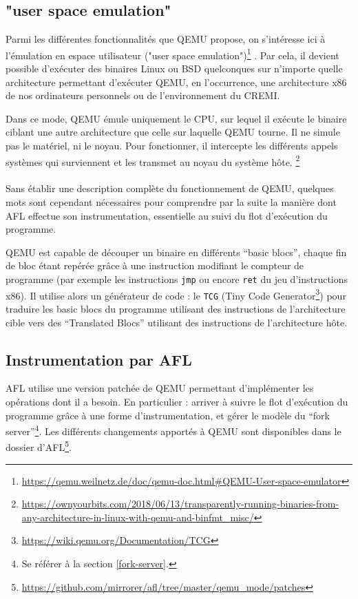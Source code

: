 \subsection{"user space emulation"}

Parmi les différentes fonctionnalités que QEMU propose, on s'intéresse ici à l'émulation en espace utilisateur ("user space emulation")\footnote{\url{https://qemu.weilnetz.de/doc/qemu-doc.html\#QEMU-User-space-emulator}} \cite{qemu}.
Par cela, il devient possible d'exécuter des binaires Linux ou BSD quelconques sur n'importe quelle architecture permettant d'exécuter QEMU, en l'occurrence, une architecture x86 de nos ordinateurs personnels ou de l'environnement du CREMI.

Dans ce mode, QEMU émule uniquement le CPU, sur lequel il exécute le binaire ciblant une autre architecture que celle sur laquelle QEMU tourne.
Il ne simule pas le matériel, ni le noyau.
Pour fonctionner, il intercepte les différents appels systèmes qui surviennent et les transmet au noyau du système hôte.
\footnote{\url{https://ownyourbits.com/2018/06/13/transparently-running-binaries-from-any-architecture-in-linux-with-qemu-and-binfmt_misc/}}

\paragraph{}
Sans établir une description complète du fonctionnement de QEMU, quelques mots sont cependant nécessaires pour comprendre par la suite la manière dont AFL effectue son instrumentation, essentielle au suivi du flot d'exécution du programme.

QEMU est capable de découper un binaire en différents ``basic blocs'', chaque fin de bloc étant repérée grâce à une instruction modifiant le compteur de programme (par exemple les instructions \lstinline{jmp} ou encore \lstinline{ret} du jeu d'instructions x86).
Il utilise alors un générateur de code : le \lstinline{TCG} (Tiny Code Generator\footnote{\url{https://wiki.qemu.org/Documentation/TCG}}) pour traduire les basic blocs du programme utilisant des instructions de l'architecture cible vers des ``Translated Blocs'' utilisant des instructions de l'architecture hôte.

\subsection{Instrumentation par AFL}

AFL utilise une version patchée de QEMU permettant d'implémenter les opérations dont il a besoin.
En particulier : arriver à suivre le flot d'exécution du programme grâce à une forme d'instrumentation, et gérer le modèle du ``fork server''\footnote{Se référer à la section \ref{fork-server}.}.
Les différents changements apportés à QEMU sont disponibles dans le dossier  d'AFL\footnote{\url{https://github.com/mirrorer/afl/tree/master/qemu_mode/patches}}.

